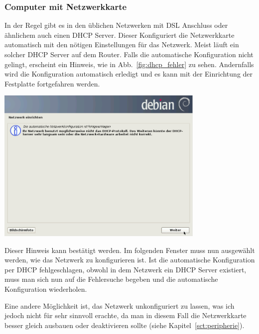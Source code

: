 \documentclass[a4paper,12pt,twoside]{article}
\begin{document}
\subsubsection{Computer mit Netzwerkkarte}
\label{sct:inst_mit_netzwerk}
In der Regel gibt es in den üblichen Netzwerken mit DSL Anschluss oder
ähnlichem auch einen DHCP Server. Dieser Konfiguriert die Netzwerkkarte
automatisch mit den nötigen Einstellungen für das Netzwerk. Meist läuft
ein solcher DHCP Server auf dem Router. Falls die automatische
Konfiguration nicht gelingt, erscheint ein Hinweis, wie in
Abb.~\ref{fig:dhcp_fehler} zu sehen. Andernfalls wird die Konfiguration
automatisch erledigt und es kann mit der Einrichtung der Festplatte
fortgefahren werden.

\begin{minipage}{\textwidth}
    \centering
    \includegraphics[width=10cm]{efaLivede-img/efaLivede-img7.png}
    \label{fig:dhcp_fehler}
\end{minipage}
\bigskip

Dieser Hinweis kann bestätigt werden. Im folgenden Fenster muss nun
ausgewählt werden, wie das Netzwerk zu konfigurieren ist. Ist die
automatische Konfiguration per DHCP fehlgeschlagen, obwohl in dem
Netzwerk ein DHCP Server existiert, muss man sich nun auf die
Fehlersuche begeben und die automatische Konfiguration wiederholen.

Eine andere Möglichkeit ist, das Netzwerk unkonfiguriert zu lassen, was
ich jedoch nicht für sehr sinnvoll erachte, da man in diesem Fall die
Netzwerkkarte besser gleich ausbauen oder deaktivieren sollte (siehe
Kapitel~\ref{sct:peripherie}).
\end{document}
